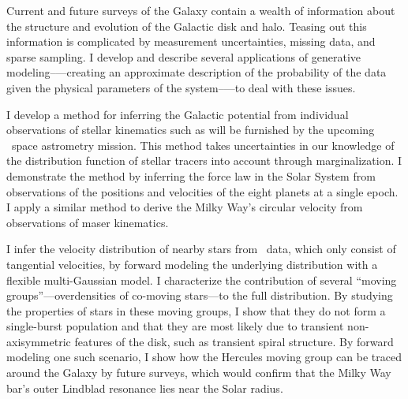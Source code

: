 Current and future surveys of the Galaxy contain a wealth of
information about the structure and evolution of the Galactic disk and
halo. Teasing out this information is complicated by measurement
uncertainties, missing data, and sparse sampling. I develop and
describe several applications of generative modeling--—creating an
approximate description of the probability of the data given the
physical parameters of the system--—to deal with these issues.

I develop a method for inferring the Galactic potential from
individual observations of stellar kinematics such as will be
furnished by the upcoming \Gaia\ space astrometry mission. This method
takes uncertainties in our knowledge of the distribution function of
stellar tracers into account through marginalization. I demonstrate
the method by inferring the force law in the Solar System from
observations of the positions and velocities of the eight planets at a
single epoch. I apply a similar method to derive the Milky Way's
circular velocity from observations of maser kinematics.

I infer the velocity distribution of nearby stars from
\hipparcos\ data, which only consist of tangential velocities, by
forward modeling the underlying distribution with a flexible
multi-Gaussian model. I characterize the contribution of several
``moving groups''---overdensities of co-moving stars---to the full
distribution. By studying the properties of stars in these moving
groups, I show that they do not form a single-burst population and
that they are most likely due to transient non-axisymmetric features
of the disk, such as transient spiral structure. By forward modeling
one such scenario, I show how the Hercules moving group can be traced
around the Galaxy by future surveys, which would confirm that the
Milky Way bar's outer Lindblad resonance lies near the Solar radius.
